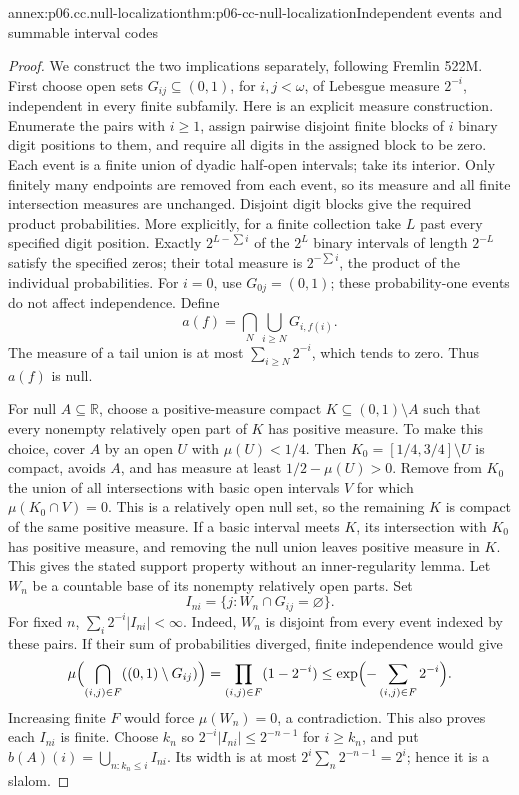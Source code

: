 \begin{annexitem}{annex:p06.cc.null-localization}{thm:p06-cc-null-localization}{Independent events and summable interval codes}
\begin{proof}
We construct the two implications separately, following Fremlin 522M.
First choose open sets \(G_{ij}\subseteq(0,1)\), for \(i,j<\omega\),
of Lebesgue measure \(2^{-i}\), independent in every finite subfamily.
Here is an explicit measure construction. Enumerate the pairs with
\(i\geq1\), assign pairwise disjoint finite blocks of \(i\) binary
digit positions to them, and require all digits in the assigned block
to be zero. Each event is a finite union of dyadic half-open intervals;
take its interior. Only finitely many endpoints are removed from each
event, so its measure and all finite intersection measures are unchanged.
Disjoint digit blocks give the required product probabilities.
More explicitly, for a finite collection take \(L\) past every specified
digit position. Exactly \(2^{L-\sum i}\) of the \(2^L\) binary intervals
of length \(2^{-L}\) satisfy the specified zeros; their total measure
is \(2^{-\sum i}\), the product of the individual probabilities.
For \(i=0\), use \(G_{0j}=(0,1)\); these probability-one events do
not affect independence. Define
\[
 a(f)=\bigcap_N\bigcup_{i\geq N}G_{i,f(i)}.
\]
The measure of a tail union is at most \(\sum_{i\geq N}2^{-i}\),
which tends to zero. Thus \(a(f)\) is null.

For null \(A\subseteq\mathbb R\), choose a positive-measure compact
\(K\subseteq(0,1)\setminus A\) such that every nonempty relatively
open part of \(K\) has positive measure. To make this choice, cover
\(A\) by an open \(U\) with \(\mu(U)<1/4\). Then
\(K_0=[1/4,3/4]\setminus U\) is compact, avoids \(A\), and has
measure at least \(1/2-\mu(U)>0\). Remove from \(K_0\) the union
of all intersections with basic open intervals \(V\) for which
\(\mu(K_0\cap V)=0\). This is a relatively open null set, so the
remaining \(K\) is compact of the same positive measure. If a basic
interval meets \(K\), its intersection with \(K_0\) has positive
measure, and removing the null union leaves positive measure in \(K\).
This gives the stated support property without an inner-regularity lemma.
Let \(W_n\) be a
countable base of its nonempty relatively open parts. Set
\[
 I_{ni}=\{j:W_n\cap G_{ij}=\varnothing\}.
\]
For fixed \(n\),
\(\sum_i2^{-i}|I_{ni}|<\infty\). Indeed, \(W_n\) is disjoint
from every event indexed by these pairs. If their sum of probabilities
diverged, finite independence would give
\[
 \mu\Bigl(\bigcap_{(i,j)\in F}((0,1)\setminus G_{ij})\Bigr)
 =\prod_{(i,j)\in F}(1-2^{-i})
 \leq\exp\Bigl(-\sum_{(i,j)\in F}2^{-i}\Bigr).
\]
Increasing finite \(F\) would force \(\mu(W_n)=0\), a contradiction.
This also proves each \(I_{ni}\) is finite.
Choose \(k_n\) so \(2^{-i}|I_{ni}|\leq2^{-n-1}\) for \(i\geq k_n\),
and put \(b(A)(i)=\bigcup_{n:k_n\leq i}I_{ni}\).
Its width is at most \(2^i\sum_n2^{-n-1}=2^i\); hence it is a slalom.


\end{proof}
\end{annexitem}
